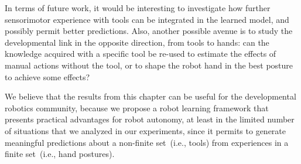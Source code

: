 In terms of future work, it would be interesting to investigate how further sensorimotor experience with tools can be integrated in the learned model, and possibly permit better predictions.
Also, another possible avenue is to study the developmental link in the opposite direction, from tools to hands: can the knowledge acquired with a specific tool be re-used to estimate the effects of manual actions without the tool, or to shape the robot hand in the best posture to achieve some effects?

We believe that the results from this chapter can be useful for the developmental robotics community, because we propose a robot learning framework that presents practical advantages for robot autonomy, at least in the limited number of situations that we analyzed in our experiments, since it permits to generate meaningful predictions about a non-finite set~(i.e., tools) from experiences in a finite set~(i.e., hand postures).
